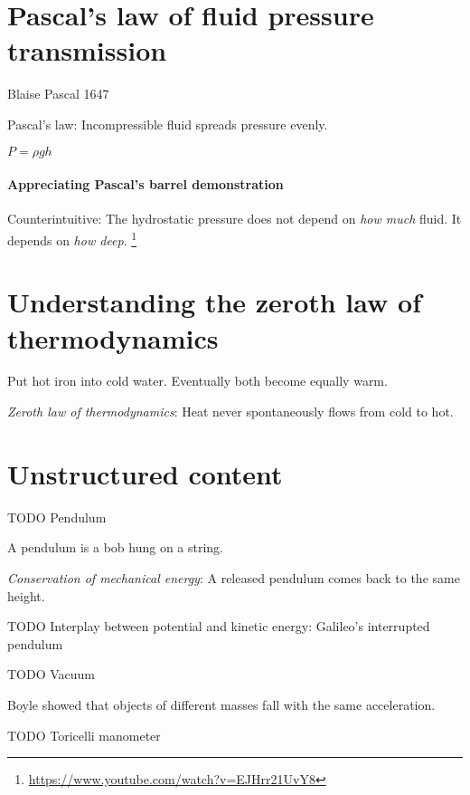 \section{Pascal's law of fluid pressure transmission}

Blaise Pascal 1647

Pascal's law: Incompressible fluid spreads pressure evenly.

%
%
%
%
\( P = \rho g h \)

\paragraph{Appreciating Pascal's barrel demonstration}

Counterintuitive: The hydrostatic pressure
does not depend on \emph{how much} fluid.
It depends on \emph{how deep}.
\footnote{\url{https://www.youtube.com/watch?v=EJHrr21UvY8}}

\section{Understanding the zeroth law of thermodynamics}

Put hot iron into cold water.
Eventually both become equally warm.

%
\emph{Zeroth law of thermodynamics}:
Heat never spontaneously flows from cold to hot.

\section{Unstructured content}

TODO Pendulum

%
%
A pendulum is a bob hung on a string.

\emph{Conservation of mechanical energy}:
A released pendulum comes back to the same height.

TODO
Interplay between potential and kinetic energy:
Galileo's interrupted pendulum

TODO Vacuum

Boyle showed that objects of different masses fall with the same acceleration.

TODO Toricelli manometer

